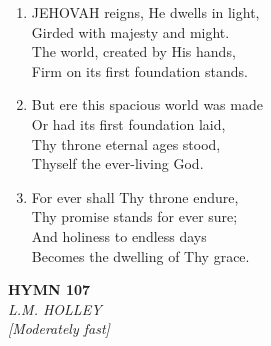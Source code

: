 \documentclass[11pt,a4paper]{article}
\begin{document}
\begin{enumerate}
    \item JEHOVAH reigns, He dwells in light, \\
        Girded with majesty and might. \\
        The world, created by His hands, \\
        Firm on its first foundation stands.

    \item But ere this spacious world was made \\
        Or had its first foundation laid, \\
        Thy throne eternal ages stood, \\
        Thyself the ever-living God.

    \item For ever shall Thy throne endure, \\
        Thy promise stands for ever sure; \\
        And holiness to endless days \\
        Becomes the dwelling of Thy grace.

\end{enumerate}

\newpage
\begin{center}
    {\Large \textbf{HYMN 107}}
    \\
    \textit{L.M. HOLLEY}
    \\
    \textit{\small [Moderately fast]}
\end{center}
\vspace{1em}
\end{document}
